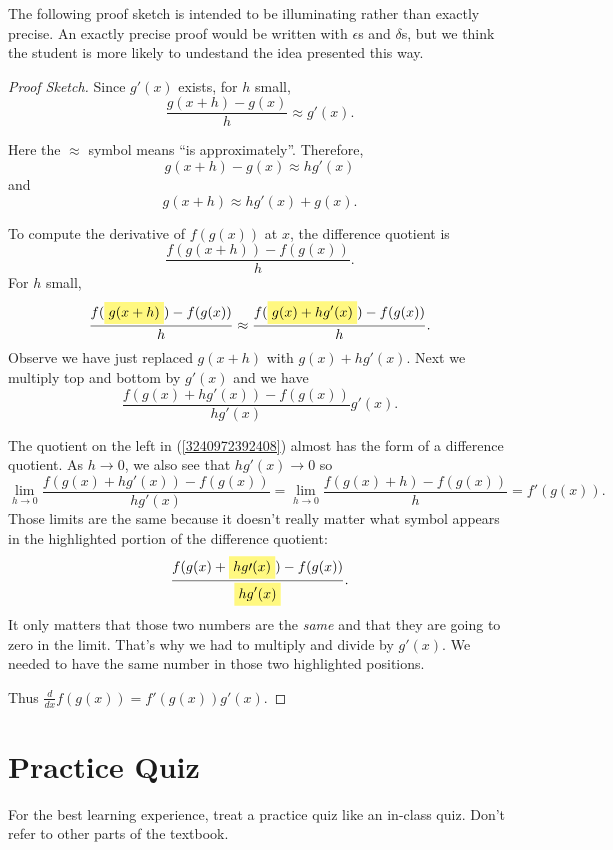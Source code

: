 \documentclass[11pt]{book}
\newcommand{\highlight}[1]{%
  \colorbox{yellow!50}{$\displaystyle#1$}}
\numberwithin{example}{chapter}
\begin{document}
The following proof sketch is intended to be illuminating rather than exactly precise.  An exactly precise proof would be written with $\epsilon$s and $\delta$s, but we think the student is more likely to undestand the idea presented this way.

\begin{proof}[Proof Sketch]

Since $g'(x)$ exists, for $h$ small, 
$$\frac{g(x+h)-g(x)}{h}\approx g'(x).$$

Here the $\approx$ symbol means ``is approximately''.  Therefore, 
$$g(x+h)-g(x)\approx hg'(x)$$
and 
$$g(x+h)\approx hg'(x)+g(x).$$

To compute the derivative of $f(g(x))$ at $x$, the difference quotient is $$\frac{f(g(x+h))-f(g(x))}{h}.$$
For $h$ small, 
$$ 
\frac{f(\highlight{g(x+h)})-f(g(x))}{h} \approx \frac{f(\highlight{g(x) + hg'(x)})-f(g(x))}{h}.$$
Observe we have just replaced $g(x+h)$ with $g(x) + hg'(x)$.  Next we multiply top and bottom by $g'(x)$ and we have 
\begin{equation} \label{3240972392408}
\frac{f(g(x) + hg'(x))-f(g(x))}{hg'(x)} g'(x).
\end{equation}

The quotient on the left in  (\ref{3240972392408}) almost has the form of a difference quotient.  As $h\to 0$, we also see that $hg'(x)\to 0$ so 
$$\lim_{h\to 0} \frac{f(g(x) + hg'(x))-f(g(x))}{hg'(x)}  = \lim_{h\to 0} \frac{f(g(x) + h)-f(g(x))}{h} = f'(g(x)).$$
Those limits are the same because it doesn't really matter what symbol appears in the highlighted portion of the difference quotient: 
$$\frac{f(g(x) + \highlight{hg\prime(x)})-f(g(x))}{\highlight{hg'(x)}}.$$
It only matters that those two numbers are the \emph{same} and that they are going to zero in the limit.  That's why we had to multiply and divide by $g'(x)$.  We needed to have the same number in those two highlighted positions.  

Thus $\frac{d}{dx}f(g(x)) = f'(g(x))g'(x)$.
\end{proof}

\section{Practice Quiz}

For the best learning experience, treat a practice quiz like an in-class quiz. Don't refer to other parts of the textbook.
\end{document}
